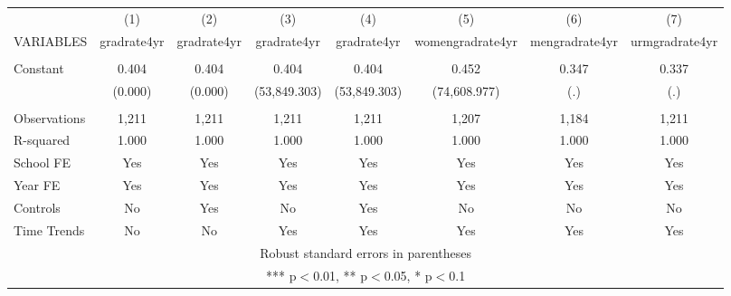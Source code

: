 \documentclass[]{article}
\begin{document}
\begin{tabular}{lccccccc} \hline
 & (1) & (2) & (3) & (4) & (5) & (6) & (7) \\
VARIABLES & gradrate4yr & gradrate4yr & gradrate4yr & gradrate4yr & womengradrate4yr & mengradrate4yr & urmgradrate4yr \\ \hline
 &  &  &  &  &  &  &  \\
Constant & 0.404 & 0.404 & 0.404 & 0.404 & 0.452 & 0.347 & 0.337 \\
 & (0.000) & (0.000) & (53,849.303) & (53,849.303) & (74,608.977) & (.) & (.) \\
 &  &  &  &  &  &  &  \\
Observations & 1,211 & 1,211 & 1,211 & 1,211 & 1,207 & 1,184 & 1,211 \\
R-squared & 1.000 & 1.000 & 1.000 & 1.000 & 1.000 & 1.000 & 1.000 \\
School FE & Yes & Yes & Yes & Yes & Yes & Yes & Yes \\
Year FE & Yes & Yes & Yes & Yes & Yes & Yes & Yes \\
Controls & No & Yes & No & Yes & No & No & No \\
 Time Trends & No & No & Yes & Yes & Yes & Yes & Yes \\ \hline
\multicolumn{8}{c}{ Robust standard errors in parentheses} \\
\multicolumn{8}{c}{ *** p$<$0.01, ** p$<$0.05, * p$<$0.1} \\
\end{tabular}
\end{document}
